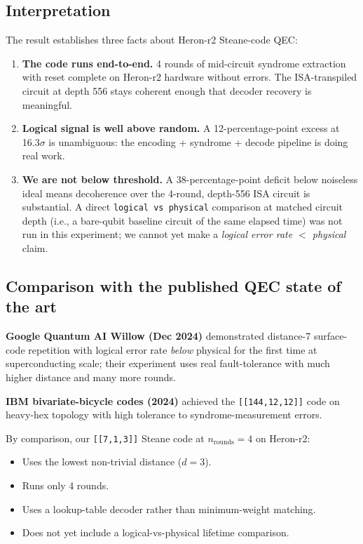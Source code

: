 \documentclass[11pt,letterpaper]{article}
\begin{document}
\subsection{Interpretation}

The result establishes three facts about Heron-r2 Steane-code QEC:

\begin{enumerate}[leftmargin=*,itemsep=0pt]
\item \textbf{The code runs end-to-end.} 4 rounds of mid-circuit syndrome extraction with reset complete on Heron-r2 hardware without errors. The ISA-transpiled circuit at depth 556 stays coherent enough that decoder recovery is meaningful.
\item \textbf{Logical signal is well above random.} A 12-percentage-point excess at 16.3$\sigma$ is unambiguous: the encoding + syndrome + decode pipeline is doing real work.
\item \textbf{We are not below threshold.} A 38-percentage-point deficit below noiseless ideal means decoherence over the 4-round, depth-556 ISA circuit is substantial. A direct \texttt{logical vs physical} comparison at matched circuit depth (i.e., a bare-qubit baseline circuit of the same elapsed time) was not run in this experiment; we cannot yet make a \emph{logical error rate $<$ physical} claim.
\end{enumerate}

\subsection{Comparison with the published QEC state of the art}\label{ssec:sota}

\textbf{Google Quantum AI Willow (Dec 2024)} demonstrated distance-7 surface-code repetition with logical error rate \emph{below} physical for the first time at superconducting scale; their experiment uses real fault-tolerance with much higher distance and many more rounds.

\textbf{IBM bivariate-bicycle codes (2024)} achieved the \texttt{[[144,12,12]]} code on heavy-hex topology with high tolerance to syndrome-measurement errors.

By comparison, our \texttt{[[7,1,3]]} Steane code at $n_{\mathrm{rounds}} = 4$ on Heron-r2:
\begin{itemize}[leftmargin=*,itemsep=0pt]
\item Uses the lowest non-trivial distance ($d = 3$).
\item Runs only 4 rounds.
\item Uses a lookup-table decoder rather than minimum-weight matching.
\item Does not yet include a logical-vs-physical lifetime comparison.
\end{itemize}
\end{document}
